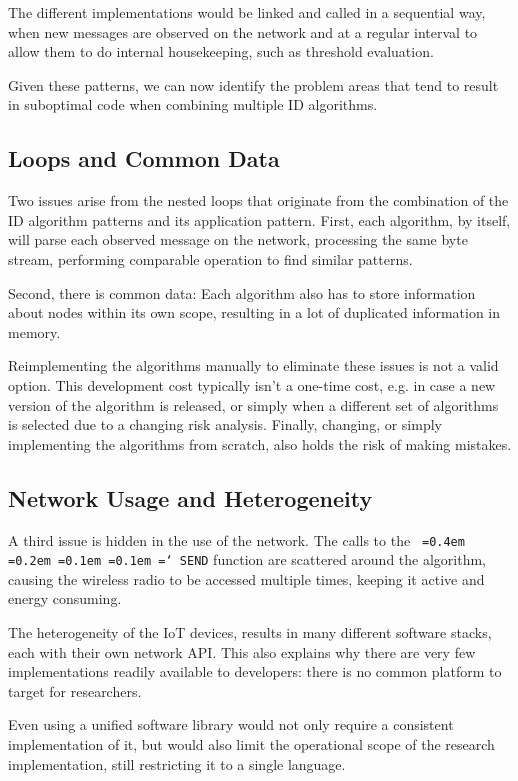 \documentclass[conference]{IEEEtran}
\newcommand*\justify{%
  \fontdimen2\font=0.4em%
  \fontdimen3\font=0.2em%
  \fontdimen4\font=0.1em%
  \fontdimen7\font=0.1em%
  \hyphenchar\font=`\-%
}
\newcommand{\ttt}[1]{\texttt{\justify{#1}}}
\begin{document}
The different implementations would be linked and called in a sequential way,
when new messages are observed on the network and at a regular interval to
allow them to do internal housekeeping, such as threshold evaluation. 

Given these patterns, we can now identify the problem areas that tend to result
in suboptimal code when combining multiple ID algorithms.

\subsection*{Loops and Common Data}

Two issues arise from the nested loops that originate from the combination of
the ID algorithm patterns and its application pattern. First, each algorithm,
by itself, will parse each observed message on the network, processing the same
byte stream, performing comparable operation to find similar patterns.

Second, there is common data: Each algorithm also has to store information
about nodes within its own scope, resulting in a lot of duplicated information
in memory.

Reimplementing the algorithms manually to eliminate these issues is not a valid
option. This development cost typically isn't a one-time cost, e.g. in case a
new version of the algorithm is released, or simply when a different set of
algorithms is selected due to a changing risk analysis. Finally, changing, or
simply implementing the algorithms from scratch, also holds the risk of making
mistakes.

\subsection*{Network Usage and Heterogeneity}

A third issue is hidden in the use of the network. The calls to the \ttt{SEND}
function are scattered around the algorithm, causing the wireless radio to be
accessed multiple times, keeping it active and energy consuming.

The heterogeneity of the IoT devices, results in many different software
stacks, each with their own network API. This also explains why there are very
few implementations readily available to developers: there is no common
platform to target for researchers.

Even using a unified software library would not only require a consistent
implementation of it, but would also limit the operational scope of the
research implementation, still restricting it to a single language.
\end{document}
